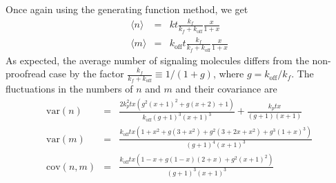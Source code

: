 \documentclass[prl,showpacs]{revtex4}
\begin{document}
Once again using the generating function method, we get
%
\begin{eqnarray}
\langle n\rangle &=&kt\frac{k_f}{k_f+k_{\text{off}}}\frac{x}{1+x}\\
\langle m\rangle &=&k_{\text{off}}t\frac{k_f}{k_f+k_{\text{off}}}\frac{x}{1+x}
\end{eqnarray}
%
As expected, the average number of signaling molecules differs from the non-proofread case by the factor $\frac{k_f}{k_f+k_{\text{off}}}\equiv 1/(1+g)$, where $g=k_{\text{off}}/k_f$. The fluctuations in the numbers of $n$ and $m$ and their covariance are
%
\begin{eqnarray}
\text{var}(n)&=&\frac{2 k_p^2 t x \left(g^2 (x+1)^2+g (x+2)+1\right)}{k_{\text{off}}(g+1)^3 (x+1)^3}+\frac{k_p tx}{(g+1) (x+1)}\nonumber\\
\text{var}(m)&=&\frac{k_{\text{off}} t x \left(1+x^2+g(3+x^2)+g^2 (3+2x+x^2)+g^3(1+x)^3\right)}{(g+1)^4 (x+1)^3}\\
\text{cov}(n,m)&=& \frac{k_{\text{off}} t x \left(1-x+g(1-x)(2+x)+g^2 (x+1)^2\right)}{(g+1)^3 (x+1)^3}\nonumber
\end{eqnarray}
\end{document}

